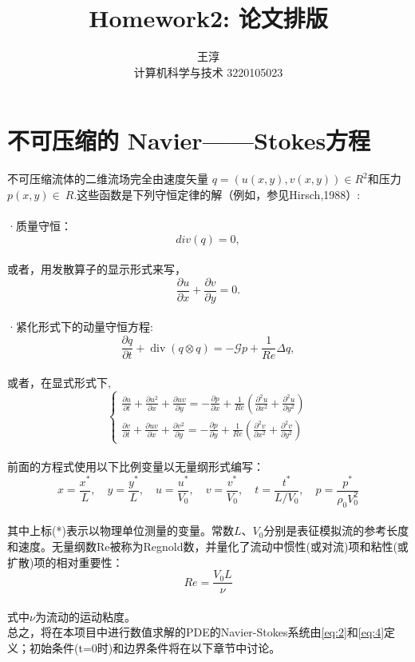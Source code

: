 \documentclass[nofonts]{ctexart}
\title{Homework2: 论文排版}
\author{王淳 \\ 计算机科学与技术 3220105023}
\begin{document}
\maketitle

\section{ 不可压缩的 Navier——Stokes方程}
不可压缩流体的二维流场完全由速度矢量 $q=\left( {u\left( {x,y} \right),v\left( {x,y} \right)} \right) \in R^{2} $和压力 $p(x,y) \in \ R$.这些函数是下列守恒定律的解\cite{Book}（例如，参见Hirsch,1988）:\\
\\·质量守恒：
\begin{equation}\label{eq:1}
     div(q) = 0,
\end{equation}
\\或者，用发散算子的显示形式来写，
\begin{equation}\label{eq:2}
    \frac{\partial u}{\partial x}+\frac{\partial v}{\partial y}=0 .
\end{equation}
\\·紧化形式下的动量守恒方程:
\begin{equation}\label{eq:3}
    \frac{\partial q}{\partial t}+\operatorname{div}(q \otimes q)=-\mathcal{G} p+\frac{1}{R e} \Delta q,
\end{equation}
\\或者，在显式形式下,
\begin{equation}\label{eq:4}
    \left\{\begin{array}{l}
\frac{\partial u}{\partial t}+\frac{\partial u^{2}}{\partial x}+\frac{\partial u v}{\partial y}=-\frac{\partial p}{\partial x}+\frac{1}{R e}\left(\frac{\partial^{2} u}{\partial x^{2}}+\frac{\partial^{2} u}{\partial y^{2}}\right) \\
\frac{\partial v}{\partial t}+\frac{\partial u v}{\partial x}+\frac{\partial v^{2}}{\partial y}=-\frac{\partial p}{\partial y}+\frac{1}{R e}\left(\frac{\partial^{2} v}{\partial x^{2}}+\frac{\partial^{2} v}{\partial y^{2}}\right)
\end{array}\right.
\end{equation}
\\前面的方程式使用以下比例变量以无量纲形式编写：
\begin{equation}\label{eq:5}
    x=\frac{x^{*}}{L}, \quad y=\frac{y^{*}}{L}, \quad u=\frac{u^{*}}{V_{0}}, \quad v=\frac{v^{*}}{V_{0}}, \quad t=\frac{t^{*}}{L / V_{0}}, \quad p=\frac{p^{*}}{\rho_{0} V_{0}^{2}}
\end{equation}
\\其中上标(*)表示以物理单位测量的变量。常数$L$、$V_{0}$分别是表征模拟流的参考长度和速度。无量纲数Re被称为Regnold数，并量化了流动中惯性(或对流)项和粘性(或扩散)项的相对重要性：
\begin{equation}\label{eq:6}
    R e=\frac{V_{0} L}{\nu}
\end{equation}
\\式中$\nu$为流动的运动粘度。
\\总之，将在本项目中进行数值求解的PDE的Navier-Stokes系统由\ref{eq:2}和\ref{eq:4}定义；初始条件(t=0时)和边界条件将在以下章节中讨论。
\end{document}
